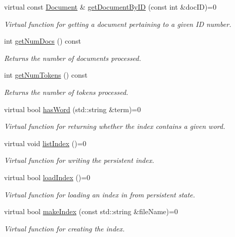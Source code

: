 \begin{DoxyCompactItemize}
virtual const \hyperlink{class_document}{Document} \& \hyperlink{class_index_interface_aa694a3e8feb722519b45f7313281bfad}{get\+Document\+By\+I\+D} (const int \&doc\+I\+D)=0
\begin{DoxyCompactList}\small\item\em Virtual function for getting a document pertaining to a given I\+D number. \end{DoxyCompactList}\item 
int \hyperlink{class_index_interface_af5d7e170720c26b3d38499d4e5e1dd69}{get\+Num\+Docs} () const 
\begin{DoxyCompactList}\small\item\em Returns the number of documents processed. \end{DoxyCompactList}\item 
int \hyperlink{class_index_interface_a3260a1213d90bd6cb6fd33043fb28b44}{get\+Num\+Tokens} () const 
\begin{DoxyCompactList}\small\item\em Returns the number of tokens processed. \end{DoxyCompactList}\item 
virtual bool \hyperlink{class_index_interface_a8ccd80a03123406cb4b1e2494349f9da}{has\+Word} (std\+::string \&term)=0
\begin{DoxyCompactList}\small\item\em Virtual function for returning whether the index contains a given word. \end{DoxyCompactList}\item 
virtual void \hyperlink{class_index_interface_ad8567919eafa87ac20c35928c929084d}{list\+Index} ()=0
\begin{DoxyCompactList}\small\item\em Virtual function for writing the persistent index. \end{DoxyCompactList}\item 
virtual bool \hyperlink{class_index_interface_a006f773f4e143745474e847cfb9f27fc}{load\+Index} ()=0
\begin{DoxyCompactList}\small\item\em Virtual function for loading an index in from persistent state. \end{DoxyCompactList}\item 
virtual bool \hyperlink{class_index_interface_a7b2ae510fa62eebb654708b90972c1b6}{make\+Index} (const std\+::string \&file\+Name)=0
\begin{DoxyCompactList}\small\item\em Virtual function for creating the index. \end{DoxyCompactList}\end{DoxyCompactItemize}


